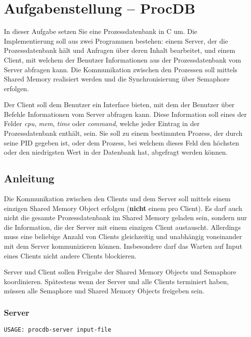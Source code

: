 



\section*{Aufgabenstellung -- ProcDB}

In dieser Aufgabe setzen Sie eine Prozessdatenbank in C um. Die Implementierung
soll aus zwei Programmen bestehen: einem Server, der die Prozessdatenbank hält
und Anfragen über deren Inhalt bearbeitet, und einem Client, mit welchem der
Benutzer Informationen aus der Prozessdatenbank vom Server abfragen kann. Die
Kommunikation zwischen den Prozessen soll mittels Shared Memory realisiert
werden und die Synchronisierung über Semaphore erfolgen.

Der Client soll dem Benutzer ein Interface bieten, mit dem der Benutzer über
Befehle Informationen vom Server abfragen kann. Diese Information soll eines
der Felder \emph{cpu}, \emph{mem}, \emph{time} oder \emph{command}, welche
jeder Eintrag in der Prozessdatenbank enthält, sein. Sie soll zu einem
bestimmten Prozess, der durch seine PID gegeben ist, oder dem Prozess, bei
welchem dieses Feld den höchsten oder den niedrigsten Wert in der Datenbank
hat, abgefragt werden können.

\subsection*{Anleitung}

Die Kommunikation zwischen den Clients und dem Server soll mittels einem
einzigen Shared Memory Object erfolgen (\textbf{nicht} einem pro Client).  Es
darf auch nicht die gesamte Prozessdatenbank im Shared Memory geladen sein,
sondern nur die Information, die der Server mit einem einzigen Client
austauscht.  Allerdings muss eine beliebige Anzahl von Clients gleichzeitig und
unabhängig voneinander mit dem Server kommunizieren können. Insbesondere darf
das Warten auf Input eines Clients nicht andere Clients blockieren.

Server und Client sollen Freigabe der Shared Memory Objects und Semaphore
koordinieren. Spätestens wenn der Server und alle Clients terminiert haben,
müssen alle Semaphore und Shared Memory Objects freigeben sein.

\subsubsection*{Server}
\begin{verbatim}
USAGE: procdb-server input-file
\end{verbatim}

